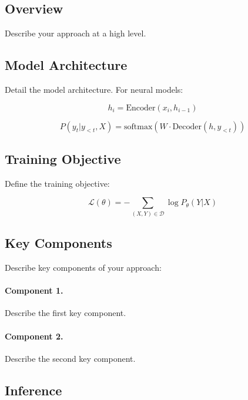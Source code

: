 \documentclass[11pt]{article}
\begin{document}
\subsection{Overview}

Describe your approach at a high level.

\subsection{Model Architecture}

Detail the model architecture. For neural models:

\begin{equation}
    h_i = \text{Encoder}(x_i, h_{i-1})
\end{equation}

\begin{equation}
    P(y_t | y_{<t}, X) = \text{softmax}(W \cdot \text{Decoder}(h, y_{<t}))
\end{equation}

\subsection{Training Objective}

Define the training objective:

\begin{equation}
    \mathcal{L}(\theta) = -\sum_{(X,Y) \in \mathcal{D}} \log P_\theta(Y|X)
\end{equation}

\subsection{Key Components}

Describe key components of your approach:

\paragraph{Component 1.} Describe the first key component.

\paragraph{Component 2.} Describe the second key component.

\subsection{Inference}
\end{document}
